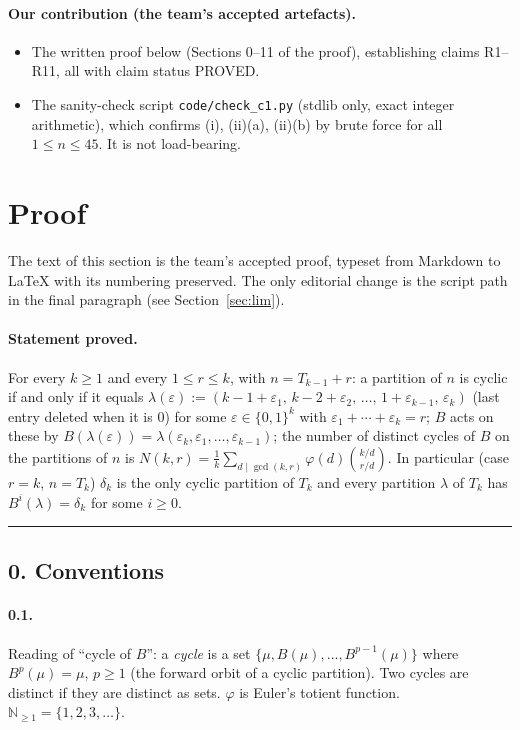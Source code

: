 \documentclass[11pt]{article}
\begin{document}
\paragraph{Our contribution (the team's accepted artefacts).}
\begin{itemize}
\item The written proof below (Sections 0--11 of the proof), establishing claims R1--R11, all with claim
status PROVED.
\item The sanity-check script \texttt{code/check\_c1.py} (stdlib only, exact integer arithmetic), which confirms
(i), (ii)(a), (ii)(b) by brute force for all $1\le n\le 45$. It is not load-bearing.
\end{itemize}

\section{Proof}

The text of this section is the team's accepted proof, typeset from Markdown to \LaTeX{} with its numbering
preserved. The only editorial change is the script path in the final paragraph (see Section~\ref{sec:lim}).

\paragraph{Statement proved.} For every $k\ge 1$ and every $1\le r\le k$, with $n=T_{k-1}+r$: a partition of $n$
is cyclic if and only if it equals
$\lambda(\varepsilon):=(k-1+\varepsilon_1,\,k-2+\varepsilon_2,\,\ldots,\,1+\varepsilon_{k-1},\,\varepsilon_k)$
(last entry deleted when it is $0$) for some $\varepsilon\in\{0,1\}^k$ with $\varepsilon_1+\cdots+\varepsilon_k=r$;
$B$ acts on these by $B(\lambda(\varepsilon))=\lambda(\varepsilon_k,\varepsilon_1,\ldots,\varepsilon_{k-1})$; the
number of distinct cycles of $B$ on the partitions of $n$ is
$N(k,r)=\frac1k\sum_{d\mid\gcd(k,r)}\varphi(d)\binom{k/d}{r/d}$. In particular (case $r=k$, $n=T_k$) $\delta_k$ is
the only cyclic partition of $T_k$ and every partition $\lambda$ of $T_k$ has $B^i(\lambda)=\delta_k$ for some
$i\ge 0$.

\medskip\hrule\medskip

\subsection*{0. Conventions}

\paragraph{0.1.} Reading of ``cycle of $B$'': a \emph{cycle} is a set $\{\mu,B(\mu),\ldots,B^{p-1}(\mu)\}$ where
$B^p(\mu)=\mu$, $p\ge1$ (the forward orbit of a cyclic partition). Two cycles are distinct if they are distinct
as sets. $\varphi$ is Euler's totient function. $\mathbb N_{\ge1}=\{1,2,3,\ldots\}$.
\end{document}

